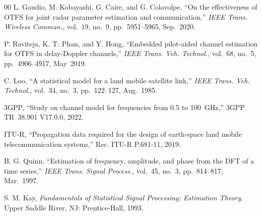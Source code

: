 ﻿\documentclass[conference]{IEEEtran}
\begin{document}
\begin{thebibliography}{00}
L. Gaudio, M. Kobayashi, G. Caire, and G. Colavolpe, ``On the effectiveness of OTFS for joint radar parameter estimation and communication,'' \textit{IEEE Trans. Wireless Commun.}, vol.~19, no.~9, pp.~5951--5965, Sep.~2020.

P. Raviteja, K. T. Phan, and Y. Hong, ``Embedded pilot-aided channel estimation for OTFS in delay-Doppler channels,'' \textit{IEEE Trans. Veh. Technol.}, vol.~68, no.~5, pp.~4906--4917, May~2019.

C. Loo, ``A statistical model for a land mobile satellite link,'' \textit{IEEE Trans. Veh. Technol.}, vol.~34, no.~3, pp.~122--127, Aug.~1985.

3GPP, ``Study on channel model for frequencies from 0.5 to 100~GHz,'' 3GPP TR~38.901 V17.0.0, 2022.

ITU-R, ``Propagation data required for the design of earth-space land mobile telecommunication systems,'' Rec. ITU-R P.681-11, 2019.

B. G. Quinn, ``Estimation of frequency, amplitude, and phase from the DFT of a time series,'' \textit{IEEE Trans. Signal Process.}, vol.~45, no.~3, pp.~814--817, Mar.~1997.

S. M. Kay, \textit{Fundamentals of Statistical Signal Processing: Estimation Theory}. Upper Saddle River, NJ: Prentice-Hall, 1993.

\end{thebibliography}
\end{document}

